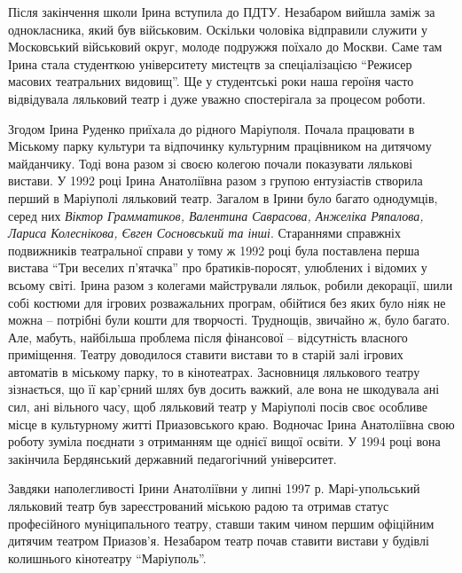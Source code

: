 
Після закінчення школи Ірина вступила до ПДТУ. Незабаром вийшла заміж за
однокласника, який був військовим. Оскільки чоловіка відправили служити у
Московський військовий округ, молоде подружжя поїхало до Москви. Саме там Ірина
стала студенткою університету мистецтв за спеціалізацією \enquote{Режисер масових
театральних видовищ}. Ще у студентські роки наша героїня часто відвідувала
ляльковий театр і дуже уважно спостерігала за процесом роботи.



Згодом Ірина Руденко приїхала до рідного Маріуполя. Почала працювати в Міському
парку культури та відпочинку культурним працівником на дитячому майданчику.
Тоді вона разом зі своєю колегою почали показувати лялькові вистави. У 1992
році Ірина Анатоліївна разом з групою ентузіастів створила перший в Маріуполі
ляльковий театр. Загалом в Ірини було багато однодумців, серед них \emph{Віктор
Грамматиков, Валентина Саврасова, Анжеліка Ряпалова, Лариса Колеснікова, Євген
Сосновський та інші}. Стараннями справжніх подвижників театральної справи у тому
ж 1992 році була поставлена перша вистава \enquote{Три веселих п'ятачка} про
братиків-поросят, улюблених і відомих у всьому світі. Ірина разом з колегами
майстрували ляльок, робили декорації, шили собі костюми для ігрових
розважальних програм, обійтися без яких було ніяк не можна – потрібні були
кошти для творчості. Труднощів, звичайно ж, було багато. Але, мабуть, найбільша
проблема після фінансової – відсутність власного приміщення. Театру доводилося
ставити вистави то в старій залі ігрових автоматів в міському парку, то в
кінотеатрах. Засновниця лялькового театру зізнається, що її кар'єрний шлях був
досить важкий, але вона не шкодувала ані сил, ані вільного часу, щоб ляльковий
театр у Маріуполі посів своє особливе місце в культурному житті Приазовського
краю. Водночас Ірина Анатоліївна свою роботу зуміла поєднати з отриманням ще
однієї вищої освіти. У 1994 році вона закінчила Бердянський державний
педагогічний університет.


Завдяки наполегливості Ірини Анатоліївни у липні 1997 р. Марі\hyp{}упольський
ляльковий театр був зареєстрований міською радою та отримав статус професійного
муніципального театру, ставши таким чином першим офіційним дитячим театром
Приазов'я. Незабаром театр почав ставити вистави у будівлі колишнього
кінотеатру \enquote{Маріуполь}.

